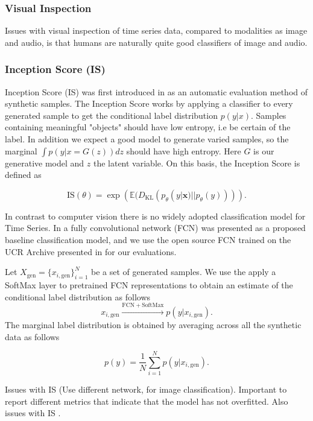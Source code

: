 \documentclass[../../thesis.tex]{subfiles}
\begin{document}
\subsubsection{Visual Inspection}

Issues with visual inspection of time series data, compared to modalities as image and audio, is that humans are naturally quite good classifiers of image and audio.


\subsubsection{Inception Score (IS)}
Inception Score (IS) was first introduced in \cite{salimans2016improved} as an automatic evaluation method of synthetic samples.\newline
The Inception Score works by applying a classifier to every generated sample to get the conditional label distribution $p(y|x)$. Samples containing meaningful "objects" should have low entropy, i.e be certain of the label. In addition we expect a good model to generate varied samples, so the marginal $\int p(y|x = G(z))dz$ should have high entropy. Here $G$ is our generative model and $z$ the latent variable. On this basis, the Inception Score is defined as 

\begin{equation}
    \label{IS}
    {\text{IS}}(\theta) = \exp\left( \mathbb{E}(D_{\text{KL}}(p_\theta(y|\mathbf{x}) || p_\theta(y))) \right).
\end{equation}

In contrast to computer vision there is no widely adopted classification model for Time Series. In \cite{wang2016time} a fully convolutional network (FCN) was presented as a proposed baseline classification model, and we use the open source FCN trained on the UCR Archive presented in \cite{TimeVQVAE} for our evaluations. \newline

Let $X_{\text{gen}} = \{x_{i,\text{gen}}\}_{i=1}^N$ be a set of generated samples. We use the apply a SoftMax layer to pretrained FCN representations to obtain an estimate of the conditional label distribution as follows
\[
    x_{i,\text{gen}} \xrightarrow{\mathrm{FCN} + \mathrm{SoftMax}} p(y |x_{i,\text{gen}}).
\]
The marginal label distribution is obtained by averaging across all the synthetic data as follows

\[
    p(y) = \frac{1}{N} \sum_{i=1}^N p(y |x_{i,\text{gen}}).
\]

Issues with IS \cite{barratt2018note} (Use different network, for image classification).  Important to report different metrics that indicate that the model has not overfitted. 
Also issues with IS \cite{borji2021pros}.\newline
\end{document}

